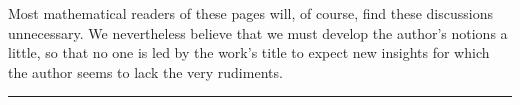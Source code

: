 Most mathematical readers of these pages will, of course, find these discussions unnecessary. We nevertheless believe that we must develop the author's notions a little, so that no one is led by the work's title to expect new insights for which the author seems to lack the very rudiments.\par
\par\noindent\hfill\rule{0.30\linewidth}{0.4pt}\hfill\mbox{}\par
